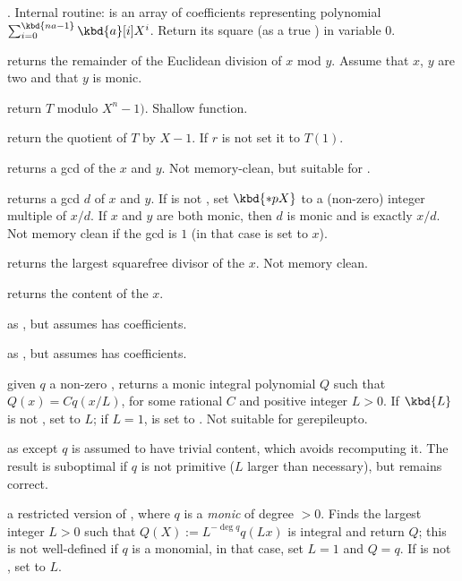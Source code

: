. Internal routine:
 is an array of coefficients representing polynomial
$\sum_{i = 0}^{\kbd{na-1}} \kbd{a}[i] X^i$. Return its square (as a true
) in variable $0$.

 returns the remainder of the Euclidean
division of $x$ mod $y$. Assume that $x$, $y$ are two  and that
$y$ is monic.

 return $T$ modulo $X^n - 1)$. Shallow
function.

 return the quotient of $T$ by $X-1$.
If $r$ is not  set it to $T(1)$.

 returns a gcd of the  $x$ and $y$.
Not memory-clean, but suitable for .

 returns a gcd $d$ of $x$ and
$y$. If  is not , set $\kbd{*pX}$ to a (non-zero) integer
multiple of $x/d$. If $x$ and $y$ are both monic, then $d$ is monic and
 is exactly $x/d$. Not memory clean if the gcd is $1$
(in that case  is set to $x$).

 returns the largest squarefree divisor
of the  $x$. Not memory clean.

 returns the content of the  $x$.

 as , but assumes  has 
coefficients.

 as , but assumes
 has  coefficients.

 given $q$ a non-zero ,
returns a monic integral polynomial $Q$ such that $Q(x) = C q(x/L)$, for some
rational $C$ and positive integer $L > 0$. If $\kbd{L}$ is not ,
set  to $L$; if $L = 1$,  is set to . Not
suitable for gerepileupto.

 as  except
$q$ is assumed to have trivial content, which avoids recomputing it.
The result is suboptimal if $q$ is not primitive ($L$ larger than
necessary), but remains correct.

 a restricted version of
, where $q$ is a \emph{monic} 
of degree $> 0$. Finds the largest integer $L > 0$ such that
$Q(X) := L^{-\deg q} q(Lx)$ is integral and return $Q$; this is not
well-defined if $q$ is a monomial, in that case, set $L=1$ and $Q = q$. If
 is not , set  to $L$.

